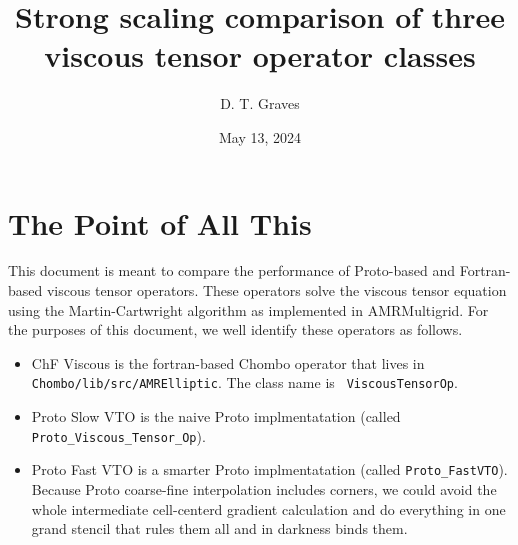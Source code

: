 \documentclass{article}
\begin{document}
\title{Strong scaling comparison of three viscous tensor operator classes}
\author{D. T. Graves   }
\date{May 13, 2024}
\maketitle



\section{The Point of All This}

This document is meant to compare the performance of Proto-based and
Fortran-based viscous tensor operators. These operators
solve the viscous tensor equation using the
Martin-Cartwright algorithm as implemented in AMRMultigrid.
For the purposes of this document, we well identify these operators as follows.
\begin{itemize}
\item ChF Viscous is the  fortran-based Chombo operator that lives in
  {\tt Chombo/lib/src/AMRElliptic}.   The class name is {\tt
    ViscousTensorOp}.
\item Proto Slow VTO is the naive Proto implmentatation (called 
  {\tt Proto\_Viscous\_Tensor\_Op}).
\item Proto Fast VTO is a smarter Proto implmentatation (called 
  {\tt Proto\_FastVTO}).  Because Proto coarse-fine interpolation
  includes  corners, we could avoid the whole intermediate
  cell-centerd gradient calculation and do everything in one grand
  stencil that rules them all and in darkness binds them.
\end{itemize}  
\end{document}
